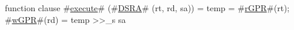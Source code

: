 function clause #\hyperref[zexecute]{execute}# (#\hyperref[zDSRA]{DSRA}# (rt, rd, sa)) =
  {
    temp     = #\hyperref[zrGPR]{rGPR}#(rt);
    #\hyperref[zwGPR]{wGPR}#(rd) = temp >>_s sa
  }
